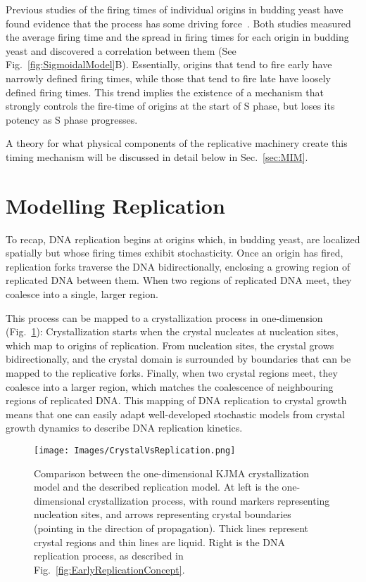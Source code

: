 		Previous studies of the firing times of individual origins in budding yeast have found evidence that the process has some driving force~\cite{ScottsPaper,StochasticTermination}.
		Both studies measured the average firing time and the spread in firing times for each origin in budding yeast and discovered a correlation between them (See Fig.~\ref{fig:SigmoidalModel}B).
		Essentially, origins that tend to fire early have narrowly defined firing times, while those that tend to fire late have loosely defined firing times.
		This trend implies the existence of a mechanism that strongly controls the fire-time of origins at the start of S phase, but loses its potency as S phase progresses.
		
		A theory for what physical components of the replicative machinery create this timing mechanism will be discussed in detail below in Sec.~\ref{sec:MIM}.
		
		
	\section{Modelling Replication}
	\label{sec:Modelling}
	
	To recap, DNA replication begins at origins which, in budding yeast, are localized spatially but whose firing times exhibit stochasticity.
	Once an origin has fired, replication forks traverse the DNA bidirectionally, enclosing a growing region of replicated DNA between them.
	When two regions of replicated DNA meet, they coalesce into a single, larger region.
	
	This process can be mapped to a crystallization process in one-dimension (Fig.~\ref{fig:CrystalVsReplication}):
	Crystallization starts when the crystal nucleates at nucleation sites, which map to origins of replication.
	From nucleation sites, the crystal grows bidirectionally, and the crystal domain is surrounded by boundaries that can be mapped to the replicative forks.
	Finally, when two crystal regions meet, they coalesce into a larger region, which matches the coalescence of neighbouring regions of replicated DNA.
	This mapping of DNA replication to crystal growth means that one can easily adapt well-developed stochastic models from crystal growth dynamics to describe DNA replication kinetics.
	
	\begin{figure}[tbh]
		\begin{center}
			\texttt{[image: Images/CrystalVsReplication.png]}
		\end{center}
			\caption[Comparing Crystallization with Replication]{\label{fig:CrystalVsReplication} Comparison between the one-dimensional KJMA crystallization model and the described replication model.
				At left is the one-dimensional crystallization process, with round markers representing nucleation sites, and arrows representing crystal boundaries (pointing in the direction of propagation).
				Thick lines represent crystal regions and thin lines are liquid.
				Right is the DNA replication process, as described in Fig.~\ref{fig:EarlyReplicationConcept}.}
	\end{figure}
	
